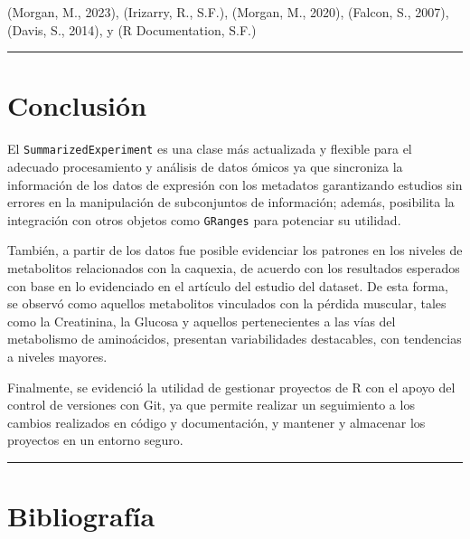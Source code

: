 \documentclass[
]{article}
\begin{document}
(Morgan, M., 2023), (Irizarry, R., S.F.), (Morgan, M., 2020), (Falcon,
S., 2007), (Davis, S., 2014), y (R Documentation, S.F.)

\begin{center}\rule{0.5\linewidth}{0.5pt}\end{center}

\section{Conclusión}\label{conclusiuxf3n}

El \texttt{SummarizedExperiment} es una clase más actualizada y flexible
para el adecuado procesamiento y análisis de datos ómicos ya que
sincroniza la información de los datos de expresión con los metadatos
garantizando estudios sin errores en la manipulación de subconjuntos de
información; además, posibilita la integración con otros objetos como
\texttt{GRanges} para potenciar su utilidad.

También, a partir de los datos fue posible evidenciar los patrones en
los niveles de metabolitos relacionados con la caquexia, de acuerdo con
los resultados esperados con base en lo evidenciado en el artículo del
estudio del dataset. De esta forma, se observó como aquellos metabolitos
vinculados con la pérdida muscular, tales como la Creatinina, la Glucosa
y aquellos pertenecientes a las vías del metabolismo de aminoácidos,
presentan variabilidades destacables, con tendencias a niveles mayores.

Finalmente, se evidenció la utilidad de gestionar proyectos de R con el
apoyo del control de versiones con Git, ya que permite realizar un
seguimiento a los cambios realizados en código y documentación, y
mantener y almacenar los proyectos en un entorno seguro.

\begin{center}\rule{0.5\linewidth}{0.5pt}\end{center}

\section{Bibliografía}\label{bibliografuxeda}
\end{document}
